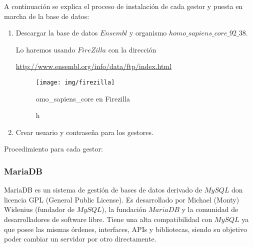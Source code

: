 \documentclass[12pt,a4paper]{article}
\begin{document}
A continuación se explica el proceso de instalación de cada gestor y puesta en marcha de la base de datos:

\begin{enumerate}

\item Descargar la base de datos $Ensembl$ y organismo $homo\_sapiens\_core\_92\_38.$

Lo haremos usando $FireZilla$  con la dirección   

\href{http://www.ensembl.org/info/data/ftp/index.html}{http://www.ensembl.org/info/data/ftp/index.html}
\begin{figure}[!h]
\centering
\texttt{[image: img/firezilla]}

\caption homo\_sapiens\_core en Firezilla
\label{fig1:fire} 
\end{figure}

\item Crear usuario y contraseña para los gestores.


\end{enumerate}

\newpage

Procedimiento para cada gestor:

\subsubsection{MariaDB} \label{pto211}

MariaDB es un sistema de gestión de bases de datos derivado de $MySQL$ don licencia GPL (General Public License). Es desarrollado por Michael (Monty) Widenius (fundador de $MySQL$), la fundación $MariaDB$ y la comunidad de desarrolladores de software libre. Tiene una alta compatibilidad con $MySQL$ ya que posee las mismas órdenes, interfaces, APIs y bibliotecas, siendo su objetivo poder cambiar un servidor por otro directamente.
\end{document}
